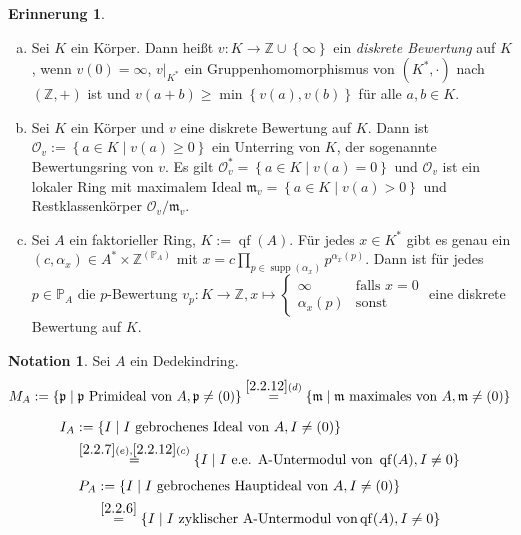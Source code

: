 \documentclass[
twoside=semi,
fontsize=12,
DIV=12, 
cleardoublepage=current,
leqno,
headings=optiontoheadandtoc, 
toc=idx
]{scrbook}
\newcommand{\Z}{\mathbb{Z}}
\renewcommand{\P}{\mathbb{P}}
\newcommand{\set}[1]{\left\{ #1 \right\}}
\DeclareMathOperator{\supp}{supp}
\DeclareMathOperator{\qf}{qf}
\theoremstyle{definition}
\newtheorem{notation}[definition]{Notation}
\newtheorem{erinnerung}[definition]{Erinnerung}
\begin{document}
 	\begin{erinnerung}\label{2.6.2}\hfill
 		\begin{enumerate}[(a)]
 			\item Sei $K$ ein K\"orper. Dann hei\ss t $v:K \to \Z \cup \set{\infty}$ ein \emph{diskrete Bewertung} auf $K$, wenn $v(0) = \infty$, $v\big|_{K^*}$ ein Gruppenhomomorphismus von $(K^*, \cdot)$ nach $(\Z, +)$ ist und $v(a + b)\geq \min \set{v(a), v(b)}$ f\"ur alle $a, b \in K$.
 			
 			\item Sei $K$ ein K\"orper und $v$ eine diskrete Bewertung auf $K$. Dann ist $\mathcal{O}_v := \set{a \in K \mid v(a) \geq 0}$ ein Unterring von $K$, der sogenannte Bewertungsring von $v$. Es gilt 
 			$\mathcal{O}_v^* = \set{a \in K \mid v(a) = 0}$ und $\mathcal{O}_v$ ist ein lokaler Ring mit maximalem Ideal $\mathfrak{m}_v = \set{a \in K \mid v(a) > 0}$ und Restklassenk\"orper $\mathcal{O}_v / \mathfrak{m}_v$.
 			
 			\item Sei $A$ ein faktorieller Ring, $K:= \qf(A)$. F\"ur jedes $x \in K^*$ gibt es genau ein \linebreak $(c, \alpha_x) \in A^*\times \Z^{(\P_A)}$ mit $x = c \prod_{p \in \supp(\alpha_x)} p^{\alpha_x(p)}$. Dann ist f\"ur jedes $p \in \P_A$ die $p$-Bewertung $v_p: K \to \Z, x \mapsto \begin{cases}
 				\infty & \textrm{falls } x = 0\\
 				\alpha_x(p) & \textrm{sonst}
 			\end{cases}$ eine diskrete Bewertung auf $K$.
 		\end{enumerate}
 	\end{erinnerung}
 
 	\begin{notation}\label{2.6.3}\hfill\newline
 		Sei $A$ ein Dedekindring.  
 		\[M_A := \set{\mathfrak{p} \mid \mathfrak{p} \textrm{ Primideal von } A, \mathfrak{p} \neq (0)} \overset{\ref{2.2.12}(d)}{=} \set{\mathfrak{m} \mid \mathfrak{m} \textrm{ maximales von } A, \mathfrak{m} \neq (0)}\]
 		
 		\begin{align*}
 			I_A &:= \set{I \mid I \textrm{ gebrochenes Ideal von } A, I \neq (0)} \\
 			&\overset{\ref{2.2.7}(e), \ref{2.2.12}(c)}{=} \set{I \mid I \textrm{ e.e. A-Untermodul von } \qf(A), I \neq 0}
 		\end{align*}
		\begin{align*}
			P_A &:= \set{I \mid I \textrm{ gebrochenes Hauptideal von } A, I \neq (0)} \\
			&\overset{\ref{2.2.6}}{=} \set{I \mid I \textrm{ zyklischer A-Untermodul von} \qf(A), I \neq 0}
		\end{align*}
 	\end{notation}
 
\end{document}
